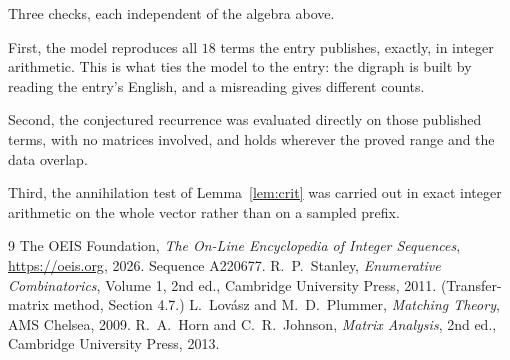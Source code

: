 \documentclass[11pt,a4paper]{article}
\theoremstyle{plain}
\theoremstyle{definition}
\begin{document}
Three checks, each independent of the algebra above.

First, the model reproduces all $18$ terms the entry publishes, exactly, in integer
arithmetic. This is what ties the model to the entry: the digraph is built by reading the
entry's English, and a misreading gives different counts.

Second, the conjectured recurrence was evaluated directly on those published terms, with no
matrices involved, and holds wherever the proved range and the data overlap.

Third, the annihilation test of Lemma~\ref{lem:crit} was carried out in exact integer
arithmetic on the whole vector rather than on a sampled prefix.

\begin{thebibliography}{9}
 The OEIS Foundation, \emph{The On-Line Encyclopedia of Integer
Sequences}, \url{https://oeis.org}, 2026. Sequence A220677.
 R.~P.~Stanley, \emph{Enumerative Combinatorics}, Volume 1, 2nd ed.,
Cambridge University Press, 2011. (Transfer-matrix method, Section 4.7.)
 L.~Lov\'asz and M.~D.~Plummer, \emph{Matching Theory}, AMS Chelsea,
2009.
 R.~A.~Horn and C.~R.~Johnson, \emph{Matrix Analysis}, 2nd ed., Cambridge
University Press, 2013.
\end{thebibliography}
\end{document}
